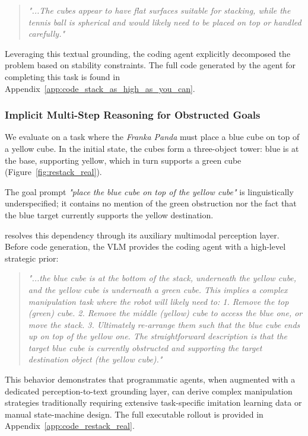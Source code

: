 \begin{quote} \textit{"...The cubes appear to have flat surfaces suitable for stacking, while the tennis ball is spherical and would likely need to be placed on top or handled carefully."} \end{quote}

Leveraging this textual grounding, the coding agent explicitly decomposed the problem based on stability constraints. The full code generated by the \sysname{} agent for completing this task is found in Appendix~\ref{app:code_stack_as_high_as_you_can}.

\subsubsection{Implicit Multi-Step Reasoning for Obstructed Goals}
\label{app:case_study_obstructed_stack}

We evaluate \textit{\sysname{}} on a task where the \textit{Franka Panda} must place a blue cube on top of a yellow cube. In the initial state, the cubes form a three-object tower: blue is at the base, supporting yellow, which in turn supports a green cube (Figure~\ref{fig:restack_real}).

The goal prompt \textit{"place the blue cube on top of the yellow cube"} is linguistically underspecified; it contains no mention of the green obstruction nor the fact that the blue target currently supports the yellow destination.

\sysname{} resolves this dependency through its auxiliary multimodal perception layer. Before code generation, the VLM provides the coding agent with a high-level strategic prior: \begin{quote} \textit{"...the blue cube is at the bottom of the stack, underneath the yellow cube, and the yellow cube is underneath a green cube. This implies a complex manipulation task where the robot will likely need to: 1.  Remove the top (green) cube. 2.  Remove the middle (yellow) cube to access the blue one, or move the stack. 3.  Ultimately re-arrange them such that the blue cube ends up on top of the yellow one. The straightforward description is that the target blue cube is currently obstructed and supporting the target destination object (the yellow cube)."} \end{quote}

This behavior demonstrates that programmatic agents, when augmented with a dedicated perception-to-text grounding layer, can derive complex manipulation strategies traditionally requiring extensive task-specific imitation learning data or manual state-machine design. The full executable rollout is provided in Appendix~\ref{app:code_restack_real}.

